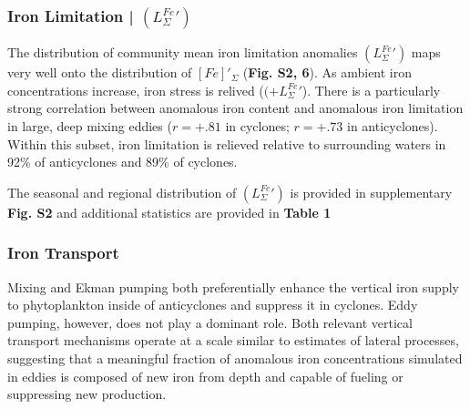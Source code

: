 \documentclass{article}
\begin{document}
\subsubsection{Iron Limitation | $(L_\Sigma^{Fe}')$}

The distribution of community mean iron limitation anomalies $(L_\Sigma^{Fe}')$ maps very well onto the distribution of $[Fe]'_\Sigma$ (\textbf{Fig. S2, 6}). As ambient iron concentrations increase, iron stress is relived ($(+L_\Sigma^{Fe}'$). There is a particularly strong correlation between anomalous iron content and anomalous iron limitation in large, deep mixing eddies ($r=+.81$ in cyclones; $r=+.73$ in anticyclones). Within this subset, iron limitation is relieved relative to surrounding waters in 92\% of anticyclones and 89\% of cyclones. 

The seasonal and regional distribution of $(L_\Sigma^{Fe}')$ is provided in supplementary \textbf{Fig. S2} and additional statistics are provided in \textbf{Table 1}


\subsubsection{Iron Transport}

Mixing and Ekman pumping both preferentially enhance the vertical iron supply to phytoplankton inside of anticyclones and suppress it in cyclones. Eddy pumping, however, does not play a dominant role. Both relevant vertical transport mechanisms operate at a scale similar to estimates of lateral processes, suggesting that a meaningful fraction of anomalous iron concentrations simulated in eddies is composed of new iron from depth and capable of fueling or suppressing new production.
\end{document}
